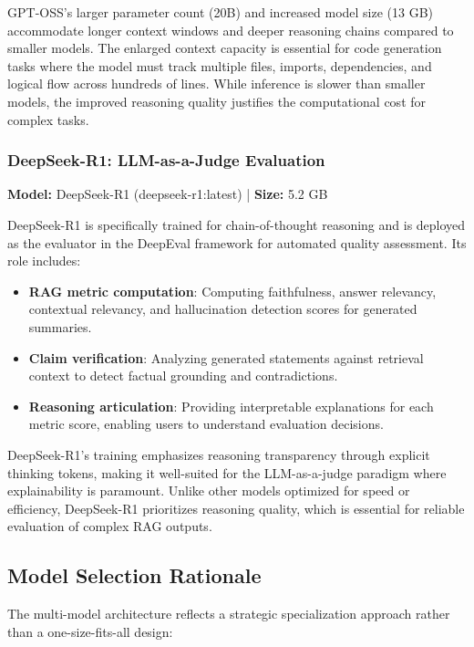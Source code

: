 GPT-OSS's larger parameter count (20B) and increased model size (13 GB) accommodate longer context windows and deeper reasoning chains compared to smaller models. The enlarged context capacity is essential for code generation tasks where the model must track multiple files, imports, dependencies, and logical flow across hundreds of lines. While inference is slower than smaller models, the improved reasoning quality justifies the computational cost for complex tasks.

\subsubsection{DeepSeek-R1: LLM-as-a-Judge Evaluation}

\textbf{Model:} DeepSeek-R1 (deepseek-r1:latest) | \textbf{Size:} 5.2 GB 

DeepSeek-R1 is specifically trained for chain-of-thought reasoning and is deployed as the evaluator in the DeepEval framework for automated quality assessment. Its role includes:

\begin{itemize}
    \item \textbf{RAG metric computation}: Computing faithfulness, answer relevancy, contextual relevancy, and hallucination detection scores for generated summaries.
    
    \item \textbf{Claim verification}: Analyzing generated statements against retrieval context to detect factual grounding and contradictions.
    
    \item \textbf{Reasoning articulation}: Providing interpretable explanations for each metric score, enabling users to understand evaluation decisions.
\end{itemize}

DeepSeek-R1's training emphasizes reasoning transparency through explicit thinking tokens, making it well-suited for the LLM-as-a-judge paradigm where explainability is paramount. Unlike other models optimized for speed or efficiency, DeepSeek-R1 prioritizes reasoning quality, which is essential for reliable evaluation of complex RAG outputs.

\subsection{Model Selection Rationale}

The multi-model architecture reflects a strategic specialization approach rather than a one-size-fits-all design:

